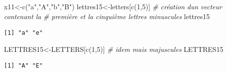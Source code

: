 \documentclass[
  8pt,
  ignorenonframetext,
]{beamer}
\newenvironment{Shaded}{\begin{snugshade}}{\end{snugshade}}
\newcommand{\CommentTok}[1]{\textcolor[rgb]{0.56,0.35,0.01}{\textit{#1}}}
\newcommand{\DecValTok}[1]{\textcolor[rgb]{0.00,0.00,0.81}{#1}}
\newcommand{\FunctionTok}[1]{\textcolor[rgb]{0.00,0.00,0.00}{#1}}
\newcommand{\NormalTok}[1]{#1}
\newcommand{\OtherTok}[1]{\textcolor[rgb]{0.56,0.35,0.01}{#1}}
\newcommand{\StringTok}[1]{\textcolor[rgb]{0.31,0.60,0.02}{#1}}
\begin{document}
\begin{frame}[fragile]
\begin{Shaded}
\begin{Highlighting}[]
\NormalTok{x11}\OtherTok{\textless{}{-}}\FunctionTok{c}\NormalTok{(}\StringTok{"a"}\NormalTok{,}\StringTok{"A"}\NormalTok{,}\StringTok{"b"}\NormalTok{,}\StringTok{"B"}\NormalTok{)}
\NormalTok{lettres15}\OtherTok{\textless{}{-}}\NormalTok{letters[}\FunctionTok{c}\NormalTok{(}\DecValTok{1}\NormalTok{,}\DecValTok{5}\NormalTok{)] }\CommentTok{\# création d\textquotesingle{}un vecteur contenant la }
\CommentTok{\# première et la cinquième lettres minuscules}
\NormalTok{lettres15}
\end{Highlighting}
\end{Shaded}

\begin{verbatim}
[1] "a" "e"
\end{verbatim}

\begin{Shaded}
\begin{Highlighting}[]
\NormalTok{LETTRES15}\OtherTok{\textless{}{-}}\NormalTok{LETTERS[}\FunctionTok{c}\NormalTok{(}\DecValTok{1}\NormalTok{,}\DecValTok{5}\NormalTok{)]  }\CommentTok{\# idem mais majuscules}
\NormalTok{LETTRES15}
\end{Highlighting}
\end{Shaded}

\begin{verbatim}
[1] "A" "E"
\end{verbatim}
\end{frame}
\end{document}
